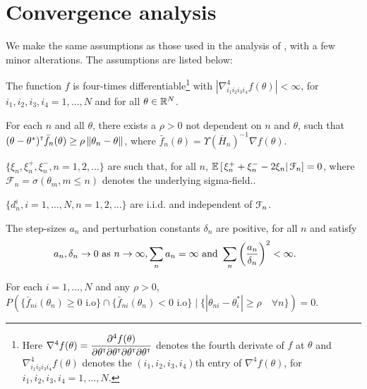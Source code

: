 \section{Convergence analysis}
\label{sec:2rdsa-results}
We make the same assumptions as those used in the analysis of \cite{prashanth2015rdsa}, with a few minor alterations. The assumptions are listed below:
\begin{pvn}
\item  The function
$f$ is four-times differentiable\footnote{Here $\nabla^4 f(\theta) = \dfrac{\partial^4 f (\theta)}{\partial \theta^\mathsf{\scriptscriptstyle T} \partial \theta^\mathsf{\scriptscriptstyle T} \partial \theta^\mathsf{\scriptscriptstyle T} \partial \theta^\mathsf{\scriptscriptstyle T}}$ denotes the fourth derivate of $f$ at $\theta$ and $\nabla^4_{i_1 i_2 i_3 i_4} f(\theta)$ denotes the $(i_1, i_2, i_3, i_4)$th entry of $\nabla^4 f(\theta)$, for $i_1, i_2, i_3,i_4=1,\ldots, N$.} with $\left|\nabla^4_{i_1 i_2 i_3 i_4} f(\theta) \right| < \infty$, for $i_1, i_2, i_3,i_4=1,\ldots, N$ and for all $\theta\in \mathbb{R}^N$. 


\item For each $n$ and all $\theta$, there exists a $\rho>0$ not dependent on $n$ and $\theta$, such that $(\theta-\theta^*)^\mathsf{\scriptscriptstyle T} \bar f_n(\theta) \ge \rho \left\| \theta_n - \theta\right\|$, where $\bar f_n(\theta) = \Upsilon(\overline H_n)^{-1} \nabla f(\theta)$.

\item $\{\xi_n, \xi_n^+,\xi_n^-, n=1,2,\ldots\}$ are such that, for all $n$, $\mathbb{E}\left[\left. \xi_n^+ + \xi_n^- - 2 \xi_n \right| \mathcal{F}_n\right] = 0$, where $\mathcal{F}_n = \sigma(\theta_m,m\le n)$ denotes the underlying sigma-field.. 

\item $\{d_n^i, i=1,\ldots,N, n=1,2,\ldots\}$ are i.i.d. and independent of $\mathcal{F}_n$.

\item  The step-sizes $a_n$ and perturbation constants $\delta_n$ are positive, for all $n$ and satisfy
$$\hspace{-1.7em} a_n, \delta_n \rightarrow 0\text{ as } n \rightarrow \infty, 
\sum_n a_n=\infty \text{ and } \sum_n \left(\frac{a_n}{\delta_n}\right)^2 <\infty.$$

\item For each $i=1,\ldots,N$ and any $\rho>0$, 
$P(\{ \bar f_{ni} (\theta_n) \ge 0 \text{ i.o}\} \cap \{ \bar f_{ni} (\theta_n) < 0 \text{ i.o}\} \mid \{ |\theta_{ni} - \theta^*_i| \ge \rho\quad \forall n\}) =0.$


\end{pvn}
